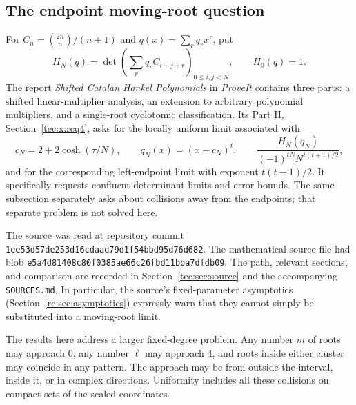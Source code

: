 \documentclass[11pt,a4paper]{article}
\numberwithin{equation}{section}
\theoremstyle{definition}
\theoremstyle{remark}
\begin{document}
\subsection{The endpoint moving-root question}
For $C_n=\binom{2n}{n}/(n+1)$ and $q(x)=\sum_r q_rx^r$, put
\begin{equation}\label{tec:eq:HN}
 H_N(q)=\det\left(\sum_r q_r C_{i+j+r}\right)_{0\le i,j<N},
 \qquad H_0(q)=1.
\end{equation}
The report \textit{Shifted Catalan Hankel Polynomials} in \textit{ProveIt} contains
three parts: a shifted linear-multiplier analysis, an extension to
arbitrary polynomial multipliers, and a single-root cyclotomic
classification. Its Part II, Section~\ref{tec:x:rcq4}, asks for the locally uniform
limit associated with
\begin{equation}\label{tec:eq:question}
 c_N=2+2\cosh(\tau/N),\qquad q_N(x)=(x-c_N)^t,
 \qquad \frac{H_N(q_N)}{(-1)^{tN}N^{t(t+1)/2}},
\end{equation}
and for the corresponding left-endpoint limit with exponent
$t(t-1)/2$. It specifically requests confluent determinant limits and
error bounds. The same subsection separately asks about collisions away
from the endpoints; that separate problem is not solved here.

The source was read at repository commit
\texttt{1ee53d57de253d16cdaad79d1f54bbd95d76d682}.
The mathematical source file had blob
\texttt{e5a4d81408c80f0385ae66c26fbd11bba7dfdb09}.
The path, relevant sections, and comparison are recorded in
Section~\ref{tec:sec:source} and the accompanying \texttt{SOURCES.md}.
In particular, the source's fixed-parameter asymptotics
(Section~\ref{rc:sec:asymptotics}) expressly warn
that they cannot simply be substituted into a moving-root limit.


The results here address a larger fixed-degree problem. Any number $m$
of roots may approach $0$, any number $\ell$ may approach $4$, and roots
inside either cluster may coincide in any pattern. The approach may be
from outside the interval, inside it, or in complex directions. Uniformity
includes all these collisions on compact sets of the scaled coordinates.
\end{document}
